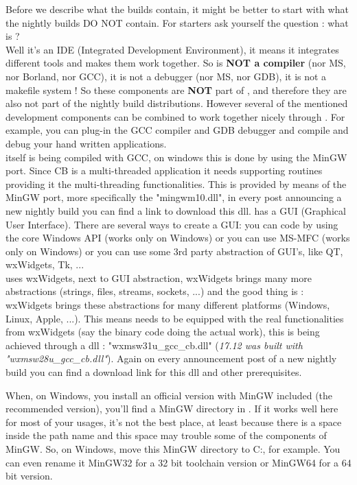Before we describe what the builds contain, it might be better to start with what the nightly builds DO NOT contain. For starters ask yourself the question : what is \codeblocks ?\\
Well it's an IDE (Integrated Development Environment), it means it integrates different tools and makes them work together. So \codeblocks is \textbf{NOT a compiler} (nor MS, nor Borland, nor GCC), it is not a debugger (nor MS, nor GDB), it is not a makefile system ! So these components are \textbf{NOT} part of \codeblocks, and therefore they are also not part of the nightly build distributions. However several of the mentioned development components can be combined to work together nicely through \codeblocks. For example, you can plug-in the GCC compiler and GDB debugger and compile and debug your hand written applications.\\
\codeblocks itself is being compiled with GCC, on windows this is done by using the MinGW port. Since CB is a multi-threaded application it needs supporting routines providing it the multi-threading functionalities. This is provided by means of the MinGW port, more specifically the "mingwm10.dll", in every post announcing a new nightly build you can find a link to download this dll.
\codeblocks has a GUI (Graphical User Interface). There are several ways to create a GUI: you can code by using the core Windows API (works only on Windows) or you can use MS-MFC (works only on Windows) or you can use some 3rd party abstraction of GUI's, like QT, wxWidgets, Tk, ...\\
\codeblocks uses wxWidgets, next to GUI abstraction, wxWidgets brings many more abstractions (strings, files, streams, sockets, ...) and the good thing is : wxWidgets brings these abstractions for many different platforms (Windows, Linux, Apple, ...). This means \codeblocks needs to be equipped with the real functionalities from wxWidgets (say the binary code doing the actual work), this is being achieved through a dll : "wxmsw31u\_gcc\_cb.dll" (\textit{17.12 was built with "wxmsw28u\_gcc\_cb.dll"}). Again on every announcement post of a new nightly build you can find a download link for this dll and other prerequisites.

When, on Windows, you install an official version with MinGW included (the recommended version), you'll find a MinGW directory in . If it works well here for most of your usages, it's not the best place, at least because there is a space inside the path name and this space may trouble some of the components of MinGW. So, on Windows, move this MinGW directory to C:, for example. You can even rename it MinGW32 for a 32 bit toolchain version or MinGW64 for a 64 bit version.

